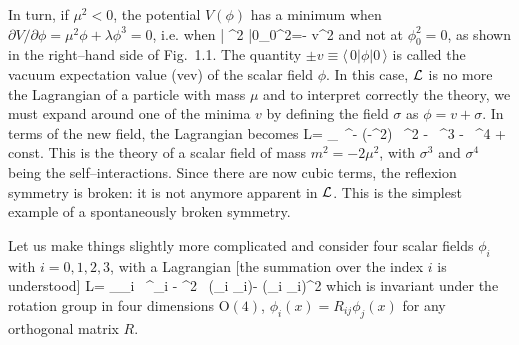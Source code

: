 \begin{figure}[htbp]
\begin{center}
\vspace*{-2.cm}
\hspace*{-2cm}
\end{center}
\vspace*{-12.3cm}
\vspace*{-3mm}
\end{figure} 

\nn In turn, if $\mu^2 <0$, the potential $V(\phi)$ has a minimum when 
$\partial V/\partial \phi=\mu^2\phi +\lambda \phi^3=0$,  i.e. when  
\beq 
{}| \phi^2 |0\rangle \equiv \phi_0^2=-  \equiv v^2 
\eeq 
and not at $\phi_0^2=0$, as shown in the right--hand side of Fig.~1.1. The
quantity $\pm v \equiv \langle \, 0|\phi| 0 \,  \rangle$ is called the vacuum
expectation value (vev) of the scalar field $\phi$. In this case, ${\cal L}$ is
no more the Lagrangian of a particle with mass $\mu$ and to interpret correctly
the theory, we must expand around one of the minima $v$ by defining the field
$\sigma$ as $\phi= v + \sigma$. In terms of the new field, the Lagrangian
becomes 
\beq
{\cal L}=  \partial_\mu \sigma \, \partial^\mu \sigma - (-\mu^2) 
\, \sigma^2 - \sqrt{ - \mu^2 \lambda} \, \sigma^3 -   \, 
\sigma^4 + {\rm const.} 
\eeq
This is the theory of a scalar field of mass $m^2=-2\mu^2$, with $\sigma^3$ and 
$\sigma^4$ being the self--interactions. Since there are now cubic terms, the 
reflexion symmetry is broken: it is not anymore apparent in ${\cal L}$. 
This is the simplest example of a spontaneously broken symmetry.  \s

Let us make things slightly more complicated and consider four scalar fields 
$\phi_i$ with {\small $i=0,1,2,3$}, with a Lagrangian [the summation over the
index $i$ is understood]
\beq
{\cal L}=  \partial_\mu \phi_i \, \partial^\mu \phi_i - 
 \mu^2 \, (\phi_i \phi_i)-  \lambda (\phi_i \phi_i)^2 
\eeq
which is invariant under the rotation group in four dimensions O$(4)$, $\phi_i 
(x) = R_{ij}   \phi_j (x)$ for any orthogonal matrix $R$. \s  

